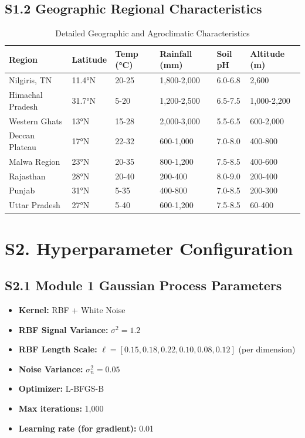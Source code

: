 \documentclass[11pt,a4paper]{article}
\begin{document}
\subsection{S1.2 Geographic Regional Characteristics}

\begin{table}[H]
\centering
\caption{Detailed Geographic and Agroclimatic Characteristics}
\label{tab:regions_detailed}
\small
\begin{tabular}{|l|l|l|l|l|l|}
\hline
\textbf{Region} & \textbf{Latitude} & \textbf{Temp (°C)} & \textbf{Rainfall (mm)} & \textbf{Soil pH} & \textbf{Altitude (m)} \\
\hline
Nilgiris, TN & 11.4°N & 20-25 & 1,800-2,000 & 6.0-6.8 & 2,600 \\
\hline
Himachal Pradesh & 31.7°N & 5-20 & 1,200-2,500 & 6.5-7.5 & 1,000-2,200 \\
\hline
Western Ghats & 13°N & 15-28 & 2,000-3,000 & 5.5-6.5 & 600-2,000 \\
\hline
Deccan Plateau & 17°N & 22-32 & 600-1,000 & 7.0-8.0 & 400-800 \\
\hline
Malwa Region & 23°N & 20-35 & 800-1,200 & 7.5-8.5 & 400-600 \\
\hline
Rajasthan & 28°N & 20-40 & 200-400 & 8.0-9.0 & 200-400 \\
\hline
Punjab & 31°N & 5-35 & 400-800 & 7.0-8.5 & 200-300 \\
\hline
Uttar Pradesh & 27°N & 5-40 & 600-1,200 & 7.5-8.5 & 60-400 \\
\hline
\end{tabular}
\end{table}

\section{S2. Hyperparameter Configuration}

\subsection{S2.1 Module 1 Gaussian Process Parameters}

\begin{itemize}
    \item \textbf{Kernel:} RBF + White Noise
    \item \textbf{RBF Signal Variance:} $\sigma^2 = 1.2$
    \item \textbf{RBF Length Scale:} $\ell = [0.15, 0.18, 0.22, 0.10, 0.08, 0.12]$ (per dimension)
    \item \textbf{Noise Variance:} $\sigma_n^2 = 0.05$
    \item \textbf{Optimizer:} L-BFGS-B
    \item \textbf{Max iterations:} 1,000
    \item \textbf{Learning rate (for gradient):} 0.01
\end{itemize}
\end{document}
